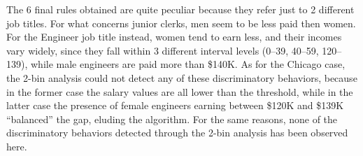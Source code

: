 \begin{itemize}
The 6 final rules obtained are quite peculiar because they refer just to 2 different job titles. For what concerns junior clerks, men seem to be less paid then women. For the Engineer job title instead, women tend to earn less, and their incomes vary widely, since they fall within 3 different interval levels (0--39, 40--59, 120--139), while male engineers are paid more than \$140K. As for the Chicago case, the 2-bin analysis could not detect any of these discriminatory behaviors, because in the former case the salary values are all lower than the threshold, while in the latter case the presence of female engineers earning between \$120K and \$139K ``balanced'' the gap, eluding the algorithm. For the same reasons, none of the discriminatory behaviors detected through the 2-bin analysis has been observed here.
\end{itemize} 


